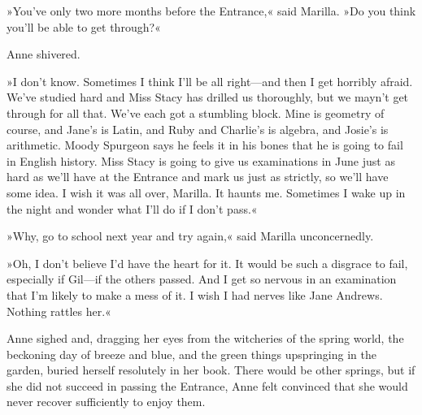»You’ve only two more months before the Entrance,« said Marilla. »Do you think you’ll be able to get through?«

Anne shivered.

»I don’t know. Sometimes I think I’ll be all right—and then I get horribly afraid. We’ve studied hard and Miss Stacy has drilled us thoroughly, but we mayn’t get through for all that. We’ve each got a stumbling block. Mine is geometry of course, and Jane’s is Latin, and Ruby and Charlie’s is algebra, and Josie’s is arithmetic. Moody Spurgeon says he feels it in his bones that he is going to fail in English history. Miss Stacy is going to give us examinations in June just as hard as we’ll have at the Entrance and mark us just as strictly, so we’ll have some idea. I wish it was all over, Marilla. It haunts me. Sometimes I wake up in the night and wonder what I’ll do if I don’t pass.«

»Why, go to school next year and try again,« said Marilla unconcernedly.

»Oh, I don’t believe I’d have the heart for it. It would be such a disgrace to fail, especially if Gil—if the others passed. And I get so nervous in an examination that I’m likely to make a mess of it. I wish I had nerves like Jane Andrews. Nothing rattles her.«

Anne sighed and, dragging her eyes from the witcheries of the spring world, the beckoning day of breeze and blue, and the green things upspringing in the garden, buried herself resolutely in her book. There would be other springs, but if she did not succeed in passing the Entrance, Anne felt convinced that she would never recover sufficiently to enjoy them.